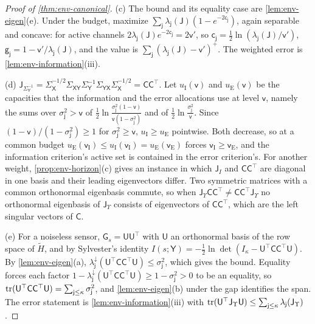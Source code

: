 \begin{proof}[Proof of \cref{thm:env-canonical}]
(c) The bound and its equality case are \cref{lem:env-eigen}(e). Under the budget, maximize $\sum_{\mathsf j}\lambda_{\mathsf j}(\mathsf J)(1-e^{-2\mathsf c_{\mathsf j}})$, again separable and concave: for active channels $2\lambda_{\mathsf j}(\mathsf J)e^{-2\mathsf c_{\mathsf j}}=2\mathsf v'$, so $\mathsf c_{\mathsf j}=\frac12\ln(\lambda_{\mathsf j}(\mathsf J)/\mathsf v')$, $\mathsf g_{\mathsf j}=1-\mathsf v'/\lambda_{\mathsf j}(\mathsf J)$, and the value is $\sum_{\mathsf j}(\lambda_{\mathsf j}(\mathsf J)-\mathsf v')^+$. The weighted error is \cref{lem:env-information}(iii).

(d) $\mathsf J_{\Sigma_{\mathsf Y}^{-1}}=\Sigma_{\mathsf X}^{-1/2}\Sigma_{\mathsf X\mathsf Y}\Sigma_{\mathsf Y}^{-1}\Sigma_{\mathsf Y\mathsf X}\Sigma_{\mathsf X}^{-1/2}=\mathsf C\mathsf C^\top$. Let $u_{\mathrm I}(\mathsf v)$ and $u_{\mathrm E}(\mathsf v)$ be the capacities that the information and the error allocations use at level $\mathsf v$, namely the sums over $\sigma_{\mathsf j}^2>\mathsf v$ of $\frac12\ln\frac{\sigma_{\mathsf j}^2(1-\mathsf v)}{\mathsf v(1-\sigma_{\mathsf j}^2)}$ and of $\frac12\ln\frac{\sigma_{\mathsf j}^2}{\mathsf v}$. Since $(1-\mathsf v)/(1-\sigma_{\mathsf j}^2)\ge1$ for $\sigma_{\mathsf j}^2\ge\mathsf v$, $u_{\mathrm I}\ge u_{\mathrm E}$ pointwise. Both decrease, so at a common budget $u_{\mathrm E}(\mathsf v_{\mathrm I})\le u_{\mathrm I}(\mathsf v_{\mathrm I})=u_{\mathrm E}(\mathsf v_{\mathrm E})$ forces $\mathsf v_{\mathrm I}\ge\mathsf v_{\mathrm E}$, and the information criterion's active set is contained in the error criterion's. For another weight, \cref{prop:env-horizon}(c) gives an instance in which $\mathsf J_I$ and $\mathsf C\mathsf C^\top$ are diagonal in one basis and their leading eigenvectors differ. Two symmetric matrices with a common orthonormal eigenbasis commute, so when $\mathsf J_\Upsilon\mathsf C\mathsf C^\top\neq\mathsf C\mathsf C^\top\mathsf J_\Upsilon$ no orthonormal eigenbasis of $\mathsf J_\Upsilon$ consists of eigenvectors of $\mathsf C\mathsf C^\top$, which are the left singular vectors of $\mathsf C$.

(e) For a noiseless sensor, $\mathsf G_s=\mathsf U\mathsf U^\top$ with $\mathsf U$ an orthonormal basis of the row space of $\tilde H$, and by Sylvester's identity $I(s;\mathsf Y)=-\frac12\ln\det(I_\kappa-\mathsf U^\top\mathsf C\mathsf C^\top\mathsf U)$. By \cref{lem:env-eigen}(a), $\lambda^\downarrow_{\mathsf j}(\mathsf U^\top\mathsf C\mathsf C^\top\mathsf U)\le\sigma_{\mathsf j}^2$, which gives the bound. Equality forces each factor $1-\lambda^\downarrow_{\mathsf j}(\mathsf U^\top\mathsf C\mathsf C^\top\mathsf U)\ge1-\sigma_{\mathsf j}^2>0$ to be an equality, so $\operatorname{tr}(\mathsf U^\top\mathsf C\mathsf C^\top\mathsf U)=\sum_{\mathsf j\le\kappa}\sigma_{\mathsf j}^2$, and \cref{lem:env-eigen}(b) under the gap identifies the span. The error statement is \cref{lem:env-information}(iii) with $\operatorname{tr}(\mathsf U^\top\mathsf J_\Upsilon\mathsf U)\le\sum_{\mathsf j\le\kappa}\lambda_{\mathsf j}(\mathsf J_\Upsilon)$.
\end{proof}

